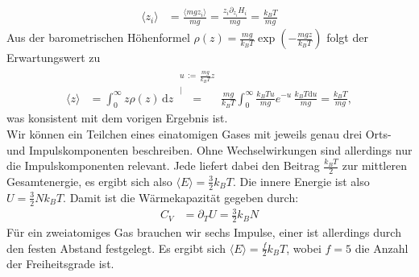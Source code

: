 \documentclass[a4paper,12pt]{article}
\newcommand{\bra}{}
\newcommand{\kom}{}
\newcommand{\intx}{}
\newcommand{\kla}{}
\begin{document}
\begin{align*}
\bra\langle {z_i}\rangle&=\frac{\bra\langle {mgz_i}\rangle}{mg}=\frac{z_i\partial_{z_i}H_i}{mg}=\frac{k_BT}{mg}
\end{align*}
Aus der barometrischen Höhenformel $\rho(z)=\frac{mg}{k_BT}\exp\kla\left( {-\frac{mgz}{k_BT}} \right)$ folgt der Erwartungswert zu
\begin{align*}
\bra\langle {z}\rangle&=\intx\int_{0}^{\infty}z\rho(z)\,\mathrm{d}z\kom\overset{\substack{{u\,:=\,\frac{mg}{k_BT}z} \\ |}}{=}\frac{mg}{k_BT}\intx\int_{0}^{\infty}\frac{k_BTu}{mg} e^{-u}\,\frac{k_BT\mathrm{d}u}{mg}=\frac{k_BT}{mg},
\end{align*}
was konsistent mit dem vorigen Ergebnis ist.\\
Wir können ein Teilchen eines einatomigen Gases mit jeweils genau drei Orts- und Impulskomponenten beschreiben. Ohne Wechselwirkungen sind allerdings nur die Impulskomponenten relevant. Jede liefert dabei den Beitrag $\frac{k_BT}{2}$ zur mittleren Gesamtenergie, es ergibt sich also $\bra\langle {E}\rangle=\frac{3}{2}k_BT$. Die innere Energie ist also $U=\frac{3}{2}Nk_BT$. Damit ist die Wärmekapazität gegeben durch:
\begin{align*}
C_V&=\partial_TU=\frac{3}{2}k_BN
\end{align*}
Für ein zweiatomiges Gas brauchen wir sechs Impulse, einer ist allerdings durch den festen Abstand festgelegt. Es ergibt sich $\bra\langle {E}\rangle=\frac{f}{2}k_BT$, wobei $f=5$ die Anzahl der Freiheitsgrade ist.
\end{document}
